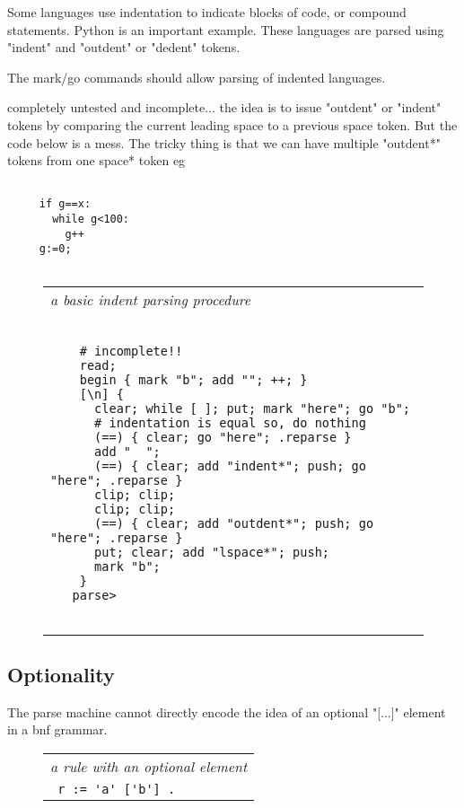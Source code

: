 \documentclass[a4paper,12pt]{article}
\begin{document}
  Some languages use indentation to indicate blocks of code, or
  compound statements. Python is an important example. These languages
  are parsed using "indent" and "outdent" or "dedent" tokens.
  
  The mark/go commands should allow parsing of indented languages.

   completely untested and incomplete...
   the idea is to issue "outdent" or "indent" tokens by
   comparing the current leading space to a previous
   space token. But the code below is a mess.
   The tricky thing is that we can have multiple "outdent*"
   tokens from one space* token eg 
 \begin{lstlisting}[breaklines] 

     if g==x:
       while g<100:
         g++
     g:=0;
   
 \end{lstlisting} 

 \begin{figure}
 \begin{tabular}{ l }
 \emph{ a basic indent parsing procedure } \\ 
 \begin{lstlisting}[breaklines] 

    # incomplete!!
    read;
    begin { mark "b"; add ""; ++; }
    [\n] { 
      clear; while [ ]; put; mark "here"; go "b";
      # indentation is equal so, do nothing
      (==) { clear; go "here"; .reparse }
      add "  ";
      (==) { clear; add "indent*"; push; go "here"; .reparse }
      clip; clip;  
      clip; clip;  
      (==) { clear; add "outdent*"; push; go "here"; .reparse }
      put; clear; add "lspace*"; push;
      mark "b";
    }   
   parse>
  
 \end{lstlisting} 
 \end{tabular} 

 \end{figure}

\subsection{Optionality}

  The parse machine cannot directly encode the idea of an
  optional "[...]" element in a bnf grammar.
 \begin{figure}
 \begin{tabular}{ l }
 \emph{ a rule with an optional element } \\ 
 \verb| r := 'a' ['b'] . |
 \end{tabular} 
 \end{figure}
\end{document}
